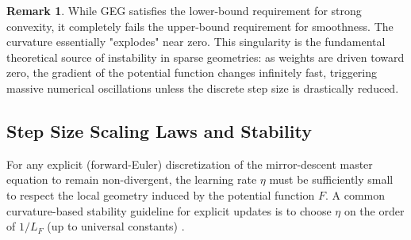 \documentclass[10pt]{amsart}
\theoremstyle{definition}
\newtheorem{remark}{\textbf{Remark}}
\theoremstyle{definition}	 %
\begin{document}
\begin{remark} 
While GEG satisfies the lower-bound requirement for strong convexity, it completely fails the upper-bound requirement for smoothness. The curvature essentially "explodes" near zero. This singularity is the fundamental theoretical source of instability in sparse geometries: as weights are driven toward zero, the gradient of the potential function changes infinitely fast, triggering massive numerical oscillations unless the discrete step size is drastically reduced.
\end{remark}
\subsection{Step Size Scaling Laws and Stability}
\label{sec:scaling}

For any explicit (forward-Euler) discretization of the mirror-descent master equation to remain non-divergent, the learning rate $\eta$ must be sufficiently small to respect the local geometry induced by the potential function $F$. A common curvature-based stability guideline for explicit updates is to choose $\eta$ on the order of $1/L_F$ (up to universal constants) \cite{Nemirowsky,Beck2003}.
\end{document}
